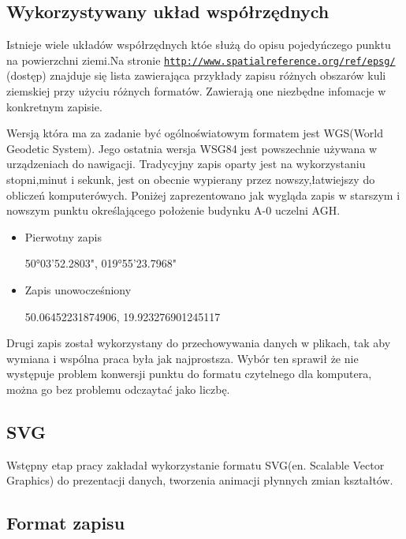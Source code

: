 \subsection{Wykorzystywany układ współrzędnych}
\label{subsec:uklad}

Istnieje wiele układów współrzędnych któe służą do opisu pojedyńczego punktu na powierzchni ziemi.Na stronie \underline{\texttt{http://www.spatialreference.org/ref/epsg/}} (dostęp) znajduje się lista zawierająca przykłady zapisu różnych obszarów kuli ziemskiej przy użyciu różnych formatów. Zawierają one niezbędne infomacje w konkretnym zapisie.

Wersją która ma za zadanie być ogólnoświatowym formatem jest WGS(World Geodetic System). Jego ostatnia wersja  WSG84 jest powszechnie używana w urządzeniach do nawigacji.
Tradycyjny zapis oparty jest na wykorzystaniu stopni,minut i sekunk, jest on obecnie wypierany przez nowszy,łatwiejszy do obliczeń komputerówych. Poniżej zaprezentowano jak wygląda zapis w starszym i nowszym punktu określającego położenie budynku A-0 uczelni AGH.

\begin{itemize}

\item
Pierwotny zapis

50°03'52.2803", 019°55'23.7968"
\item
Zapis unowocześniony

50.06452231874906, 19.923276901245117
\end{itemize}

Drugi zapis został wykorzystany do przechowywania danych w plikach, tak aby wymiana i wspólna praca była jak najprostsza. Wybór ten sprawił że nie występuje problem konwersji punktu do formatu czytelnego dla komputera, można go bez problemu odczaytać jako liczbę.

\subsection{SVG}
\label{subsec:svg}

Wstępny etap pracy zakładał wykorzystanie formatu SVG(en. Scalable Vector Graphics) do prezentacji danych, tworzenia animacji płynnych zmian kształtów.\nocite{svgbegin}\nocite{html5canvas}

\subsection{Format zapisu}
\label{subsec:zapis}

